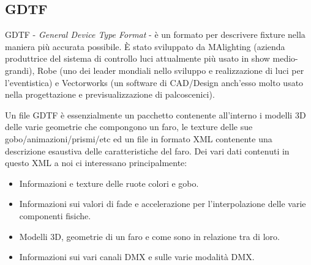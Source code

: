 \documentclass[main.tex]{subfiles}
\begin{document}
\subsection{GDTF}\label{subsec:1_gdtf}
GDTF - \textit{General Device Type Format} - è un formato per descrivere fixture nella maniera più accurata possibile. È stato sviluppato da MAlighting (azienda produttrice del sistema di controllo luci attualmente più usato in show medio-grandi), Robe (uno dei leader mondiali nello sviluppo e realizzazione di luci per l'eventistica) e Vectorworks (un software di CAD/Design anch'esso molto usato nella progettazione e previsualizzazione di palcoscenici). 
\newline

\noindent Un file GDTF è essenzialmente un pacchetto contenente all'interno i modelli 3D delle varie geometrie che compongono un faro, le texture delle sue gobo/animazioni/prismi/etc ed un file in formato XML contenente una descrizione esaustiva delle caratteristiche del faro. \newline
Dei vari dati contenuti in questo XML a noi ci interessano principalmente:
\begin{itemize}
    \item Informazioni e texture delle ruote colori e gobo.
    \item Informazioni sui valori di fade e accelerazione per l'interpolazione delle varie componenti fisiche.
    \item Modelli 3D, geometrie di un faro e come sono in relazione tra di loro.
    \item Informazioni sui vari canali DMX e sulle varie modalità DMX.
\end{itemize}
\end{document}
